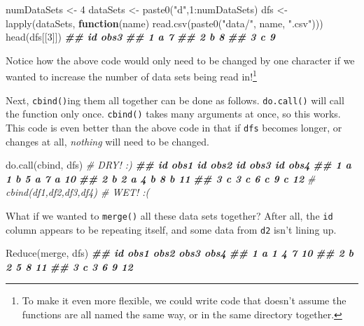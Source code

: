 \documentclass[
  12pt,
  krantz2]{krantz}
\makeatletter
\newenvironment{Shaded}{\begin{snugshade}}{\end{snugshade}}
\newcommand{\CommentTok}[1]{\textcolor[rgb]{0.37,0.37,0.37}{\textit{#1}}}
\newcommand{\ControlFlowTok}[1]{\textcolor[rgb]{0.27,0.27,0.27}{\textbf{#1}}}
\newcommand{\DecValTok}[1]{\textcolor[rgb]{0.06,0.06,0.06}{#1}}
\newcommand{\DocumentationTok}[1]{\textcolor[rgb]{0.37,0.37,0.37}{\textbf{\textit{#1}}}}
\newcommand{\FunctionTok}[1]{\textcolor[rgb]{0,0,0}{#1}}
\newcommand{\NormalTok}[1]{#1}
\newcommand{\OtherTok}[1]{\textcolor[rgb]{0.37,0.37,0.37}{#1}}
\newcommand{\SpecialCharTok}[1]{\textcolor[rgb]{0,0,0}{#1}}
\newcommand{\StringTok}[1]{\textcolor[rgb]{0.5,0.5,0.5}{#1}}
\newenvironment{kframe}{%
\medskip{}
\setlength{\fboxsep}{.8em}
 \def\at@end@of@kframe{}%
 \ifinner\ifhmode%
  \def\at@end@of@kframe{\end{minipage}}%
  \begin{minipage}{\columnwidth}%
 \fi\fi%
 \def\FrameCommand##1{\hskip\@totalleftmargin \hskip-\fboxsep
 \colorbox{shadecolor}{##1}\hskip-\fboxsep
     \hskip-\linewidth \hskip-\@totalleftmargin \hskip\columnwidth}%
 \MakeFramed {\advance\hsize-\width
   \@totalleftmargin\z@ \linewidth\hsize
   \@setminipage}}%
 {\par\unskip\endMakeFramed%
 \at@end@of@kframe}
\renewenvironment{Shaded}{\begin{kframe}}{\end{kframe}}
\makeatother
\begin{document}
\begin{Shaded}
\begin{Highlighting}[]
\NormalTok{numDataSets }\OtherTok{\textless{}{-}} \DecValTok{4}
\NormalTok{dataSets }\OtherTok{\textless{}{-}} \FunctionTok{paste0}\NormalTok{(}\StringTok{"d"}\NormalTok{,}\DecValTok{1}\SpecialCharTok{:}\NormalTok{numDataSets)}
\NormalTok{dfs }\OtherTok{\textless{}{-}} \FunctionTok{lapply}\NormalTok{(dataSets, }
              \ControlFlowTok{function}\NormalTok{(name) }\FunctionTok{read.csv}\NormalTok{(}\FunctionTok{paste0}\NormalTok{(}\StringTok{"data/"}\NormalTok{, name, }\StringTok{".csv"}\NormalTok{)))}
\FunctionTok{head}\NormalTok{(dfs[[}\DecValTok{3}\NormalTok{]])}
\DocumentationTok{\#\#   id obs3}
\DocumentationTok{\#\# 1  a    7}
\DocumentationTok{\#\# 2  b    8}
\DocumentationTok{\#\# 3  c    9}
\end{Highlighting}
\end{Shaded}

Notice how the above code would only need to be changed by one character if we wanted to increase the number of data sets being read in!\footnote{To make it even more flexible, we could write code that doesn't assume the functions are all named the same way, or in the same directory together.}

Next, \texttt{cbind()}ing them all together can be done as follows. \texttt{do.call()} will call the function only once. \texttt{cbind()} takes many arguments at once, so this works. This code is even better than the above code in that if \texttt{dfs} becomes longer, or changes at all, \emph{nothing} will need to be changed.

\begin{Shaded}
\begin{Highlighting}[]
\FunctionTok{do.call}\NormalTok{(cbind, dfs) }\CommentTok{\# DRY! :)}
\DocumentationTok{\#\#   id obs1 id obs2 id obs3 id obs4}
\DocumentationTok{\#\# 1  a    1  b    5  a    7  a   10}
\DocumentationTok{\#\# 2  b    2  a    4  b    8  b   11}
\DocumentationTok{\#\# 3  c    3  c    6  c    9  c   12}
\CommentTok{\# cbind(df1,df2,df3,df4) \# WET! :(}
\end{Highlighting}
\end{Shaded}

What if we wanted to \texttt{merge()} all these data sets together? After all, the \texttt{id} column appears to be repeating itself, and some data from \texttt{d2} isn't lining up.

\begin{Shaded}
\begin{Highlighting}[]
\FunctionTok{Reduce}\NormalTok{(merge, dfs)}
\DocumentationTok{\#\#   id obs1 obs2 obs3 obs4}
\DocumentationTok{\#\# 1  a    1    4    7   10}
\DocumentationTok{\#\# 2  b    2    5    8   11}
\DocumentationTok{\#\# 3  c    3    6    9   12}
\end{Highlighting}
\end{Shaded}
\end{document}
